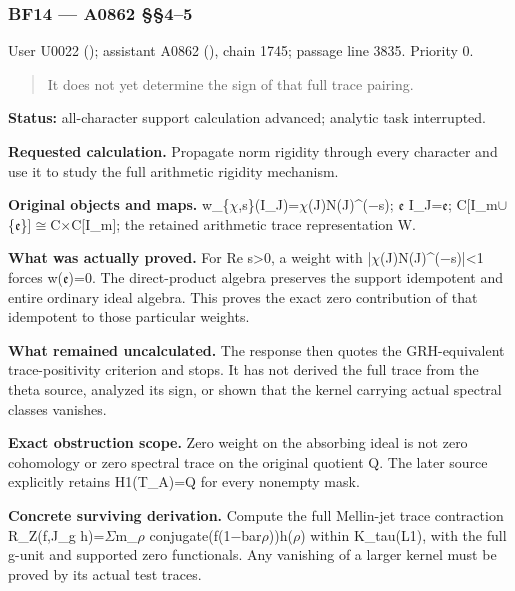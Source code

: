 \documentclass[10pt,a4paper,oneside]{report}
\begin{document}
\subsubsection{BF14 --- A0862 §§4--5}\label{bf14-a0862-45}

User U0022 (\protect{});
assistant A0862 (\protect{}),
chain 1745; passage line 3835. Priority 0.

\begin{quote}
It does not yet determine the sign of that full trace pairing.
\end{quote}

\textbf{Status:} all-character support calculation advanced; analytic
task interrupted.

\textbf{Requested calculation.} Propagate norm rigidity through every
character and use it to study the full arithmetic rigidity mechanism.

\textbf{Original objects and maps.}
w\_\{\allowbreak{}\ensuremath{χ}\allowbreak{},s\}(I\_J)=\allowbreak{}\ensuremath{χ}\allowbreak{}(J)N(J)\textasciicircum{}(\allowbreak{}\ensuremath{−}\allowbreak{}s);
\allowbreak{}\ensuremath{𝔢}\allowbreak{}
I\_J=\allowbreak{}\ensuremath{𝔢}\allowbreak{};
C[I\_m\allowbreak{}\ensuremath{∪}\allowbreak{}\{\allowbreak{}\ensuremath{𝔢}\allowbreak{}\}]\allowbreak{}\ensuremath{≅}\allowbreak{}C\allowbreak{}\ensuremath{×}\allowbreak{}C[I\_m];
the retained arithmetic trace representation W.

\textbf{What was actually proved.} For Re s\textgreater0, a weight with
|\allowbreak{}\ensuremath{χ}\allowbreak{}(J)N(J)\textasciicircum{}(\allowbreak{}\ensuremath{−}\allowbreak{}s)|<1
forces w(\allowbreak{}\ensuremath{𝔢}\allowbreak{})=0. The direct-product
algebra preserves the support idempotent and entire ordinary ideal
algebra. This proves the exact zero contribution of that idempotent to
those particular weights.

\textbf{What remained uncalculated.} The response then quotes the
GRH-equivalent trace-positivity criterion and stops. It has not derived
the full trace from the theta source, analyzed its sign, or shown that
the kernel carrying actual spectral classes vanishes.

\textbf{Exact obstruction scope.} Zero weight on the absorbing ideal is
not zero cohomology or zero spectral trace on the original quotient Q.
The later source explicitly retains H1(T\_A)=Q for every nonempty mask.

\textbf{Concrete surviving derivation.} Compute the full Mellin-jet
trace contraction R\_Z(f,J\_g
h)=\allowbreak{}\ensuremath{Σ}\allowbreak{}m\_\allowbreak{}\ensuremath{ρ}\allowbreak{}
conjugate(f(1\allowbreak{}\ensuremath{−}\allowbreak{}bar\allowbreak{}\ensuremath{ρ}\allowbreak{}))h(\allowbreak{}\ensuremath{ρ}\allowbreak{})
within K\_tau(L1), with the full g-unit and supported zero functionals.
Any vanishing of a larger kernel must be proved by its actual test
traces.
\end{document}
